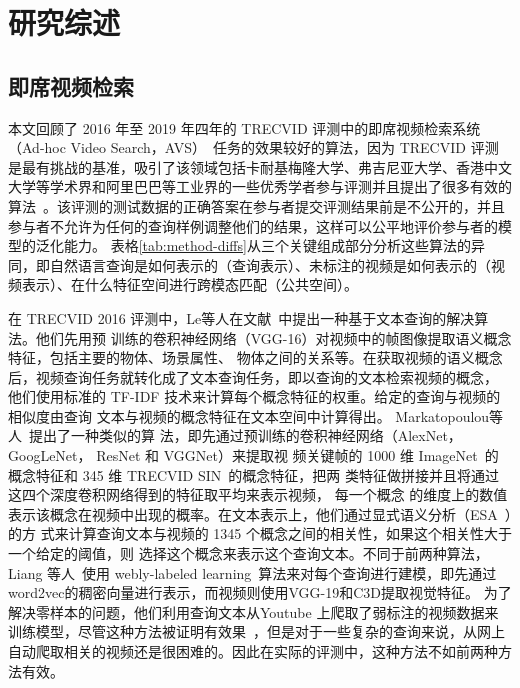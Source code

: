 \chapter{研究综述}

\section{即席视频检索}

本文回顾了 2016 年至 2019 年四年的 TRECVID 评测中的即席视频检索系统（Ad-hoc Video Search，AVS）~\cite{awad2016trecvid,awad2017trecvid,awad2018trecvid,awad2019trecvid}任务的效果较好的算法，因为 TRECVID 评测是最有挑战的基准，吸引了该领域包括卡耐基梅隆大学、弗吉尼亚大学、香港中文大学等学术界和阿里巴巴等工业界的一些优秀学者参与评测并且提出了很多有效的算法~\cite{}。该评测的测试数据的正确答案在参与者提交评测结果前是不公开的，并且参与者不允许为任何的查询样例调整他们的结果，这样可以公平地评价参与者的模型的泛化能力。
表格\ref{tab:method-diffs}从三个关键组成部分分析这些算法的异同，即自然语言查询是如何表示的（查询表示）、未标注的视频是如何表示的（视频表示）、在什么特征空间进行跨模态匹配（公共空间）。



在 TRECVID 2016 评测中，Le等人在文献~\cite{le2016nii}中提出一种基于文本查询的解决算法。他们先用预
训练的卷积神经网络（VGG-16）对视频中的帧图像提取语义概念特征，包括主要的物体、场景属性、
物体之间的关系等。在获取视频的语义概念后，视频查询任务就转化成了文本查询任务，即以查询的文本检索视频的概念，
他们使用标准的 TF-IDF 技术来计算每个概念特征的权重。给定的查询与视频的相似度由查询
文本与视频的概念特征在文本空间中计算得出。
Markatopoulou等人~\cite{foteini2016iti}提出了一种类似的算
法，即先通过预训练的卷积神经网络（AlexNet， GoogLeNet， ResNet 和 VGGNet）来提取视
频关键帧的 1000 维 ImageNet~\cite{russakovsky2015imagenet}的概念特征和 345 维 TRECVID SIN~\cite{smeaton2009high}的概念特征，把两
类特征做拼接并且将通过这四个深度卷积网络得到的特征取平均来表示视频， 每一个概念
的维度上的数值表示该概念在视频中出现的概率。在文本表示上，他们通过显式语义分析（ESA~\cite{gabrilovich2007computing}）的方
式来计算查询文本与视频的 1345 个概念之间的相关性，如果这个相关性大于一个给定的阈值，则
选择这个概念来表示这个查询文本。不同于前两种算法，Liang 等人~\cite{liang2016inf}使用 webly-labeled
learning~\cite{liang2016learning}算法来对每个查询进行建模，即先通过word2vec的稠密向量进行表示，而视频则使用VGG-19和C3D提取视觉特征。
为了解决零样本的问题，他们利用查询文本从Youtube 上爬取了弱标注的视频数据来训练模型，尽管这种方法被证明有效果~\cite{kordumova2015best}，但是对于一些复杂的查询来说，从网上自动爬取相关的视频还是很困难的。因此在实际的评测中，这种方法不如前两种方法有效。

